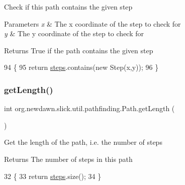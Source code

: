 Check if this path contains the given step


\begin{DoxyParams}{Parameters}
{\em x} & The x coordinate of the step to check for \\
\hline
{\em y} & The y coordinate of the step to check for \\
\hline
\end{DoxyParams}
\begin{DoxyReturn}{Returns}
True if the path contains the given step 
\end{DoxyReturn}

\begin{DoxyCode}
94                                           \{
95         \textcolor{keywordflow}{return} \mbox{\hyperlink{classorg_1_1newdawn_1_1slick_1_1util_1_1pathfinding_1_1_path_ac2472e1febece895b3e77854043fb4ad}{steps}}.contains(\textcolor{keyword}{new} Step(x,y));
96     \}
\end{DoxyCode}
\mbox{\label{classorg_1_1newdawn_1_1slick_1_1util_1_1pathfinding_1_1_path_a6aa805d1ba541d0136586273e1e68b2a}} 
\subsubsection{\texorpdfstring{get\+Length()}{getLength()}}
{\footnotesize\ttfamily int org.\+newdawn.\+slick.\+util.\+pathfinding.\+Path.\+get\+Length (\begin{DoxyParamCaption}{ }\end{DoxyParamCaption})\hspace{0.3cm}{\ttfamily [inline]}}

Get the length of the path, i.\+e. the number of steps

\begin{DoxyReturn}{Returns}
The number of steps in this path 
\end{DoxyReturn}

\begin{DoxyCode}
32                            \{
33         \textcolor{keywordflow}{return} \mbox{\hyperlink{classorg_1_1newdawn_1_1slick_1_1util_1_1pathfinding_1_1_path_ac2472e1febece895b3e77854043fb4ad}{steps}}.size();
34     \}
\end{DoxyCode}
\mbox{\label{classorg_1_1newdawn_1_1slick_1_1util_1_1pathfinding_1_1_path_acc362a056f4565a8eec1361266eac671}} 

